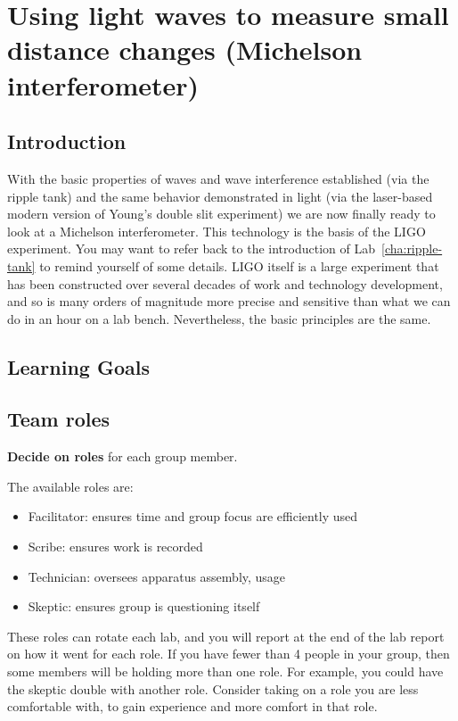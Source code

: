 \chapter{Using light waves to measure small distance changes (Michelson interferometer)}

\section{Introduction}

With the basic properties of waves and wave interference established (via the ripple tank) and the same behavior
demonstrated in light (via the laser-based modern version of Young's double slit experiment) we are now finally ready to
look at a Michelson interferometer. This technology is the basis of the LIGO experiment. You may want to refer back to
the introduction of Lab~\ref{cha:ripple-tank} to remind yourself of some details. LIGO itself is a large experiment that has
been constructed over several decades of work and technology development, and so is many orders of magnitude more
precise and sensitive than what we can do in an hour on a lab bench. Nevertheless, the basic principles are the same.

\section{Learning Goals}

\section{Team roles}

\begin{steps}
	\item \textbf{Decide on roles} for each group member.
\end{steps}

The available roles are:

\begin{itemize}
	\item Facilitator: ensures time and group focus are efficiently used
	\item Scribe: ensures work is recorded
	\item Technician: oversees apparatus assembly, usage
	\item Skeptic: ensures group is questioning itself
\end{itemize}

These roles can rotate each lab, and you will report at the end of the lab report on how it went for each role. If you have fewer than 4 people in your group, then some members will be holding more than one role. For example, you could have the skeptic double with another role. Consider taking on a role you are less comfortable with, to gain experience and more comfort in that role.

